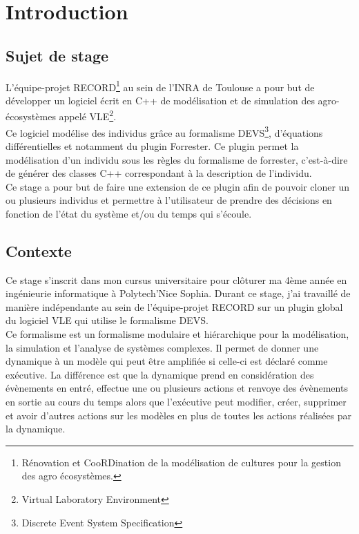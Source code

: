 \chapter{Introduction}
\setlength{\parskip}{2.5ex plus .4ex minus .4ex}
\section{Sujet de stage}
L'équipe-projet RECORD\footnote{Rénovation et CooRDination de la modélisation de cultures pour la
gestion des agro écosystèmes.} au sein de l'INRA de Toulouse a pour but de développer un logiciel écrit en C++ de modélisation et de simulation des agro-écosystèmes appelé VLE\footnote{Virtual Laboratory Environment}.\\
Ce logiciel modélise des individus grâce au formalisme DEVS\footnote{Discrete Event System Specification}, d'équations différentielles et notamment du plugin Forrester. Ce plugin permet la modélisation d'un individu sous les règles du formalisme de forrester, c'est-à-dire de générer des classes C++ correspondant à la description de l'individu.\\
Ce stage a pour but de faire une extension de ce plugin afin de pouvoir cloner un ou plusieurs individus et permettre à l'utilisateur de prendre des décisions en fonction de l'état du système et/ou du temps qui s'écoule.\\

\section{Contexte}
Ce stage s'inscrit dans mon cursus universitaire pour clôturer ma 4ème année en ingénieurie informatique à Polytech'Nice Sophia.
Durant ce stage, j'ai travaillé de manière indépendante au sein de l'équipe-projet RECORD sur un plugin global du logiciel VLE qui utilise le formalisme DEVS.\\
Ce formalisme est un formalisme modulaire et hiérarchique pour la modélisation, la simulation et l'analyse de systèmes complexes. Il permet de donner une dynamique à un modèle qui peut être amplifiée si celle-ci est déclaré comme exécutive. La différence est que la dynamique prend en considération des évènements en entré, effectue une ou plusieurs actions et renvoye des évènements en sortie au cours du temps alors que l'exécutive peut modifier, créer, supprimer et avoir d'autres actions sur les modèles en plus de toutes les actions réalisées par la dynamique.\\

